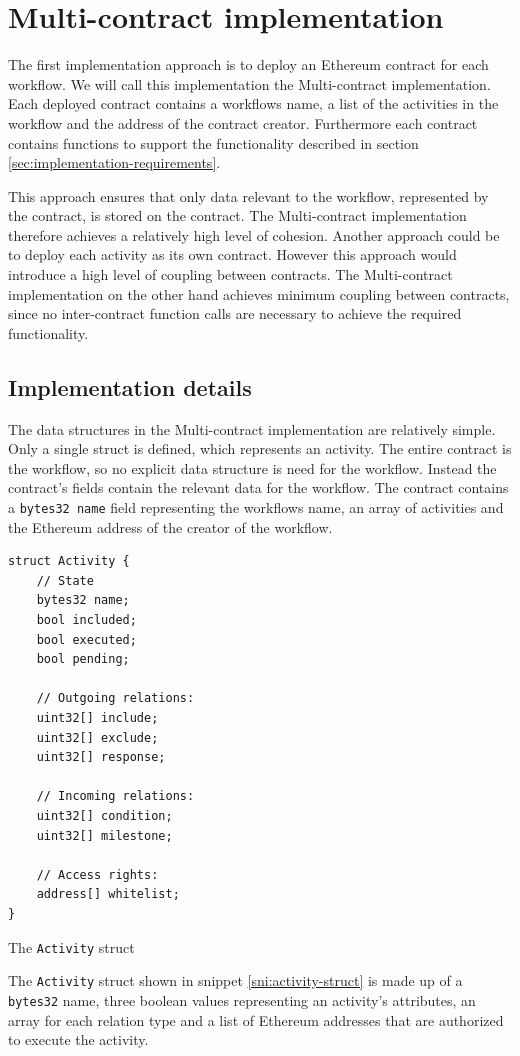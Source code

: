 \documentclass{article}
\begin{document}
	\section{Multi-contract implementation}

	The first implementation approach is to deploy an Ethereum contract for each workflow. We will call this implementation the Multi-contract implementation.
	Each deployed contract contains a workflows name, a list of the activities in the workflow and the address of the contract creator.
	Furthermore each contract contains functions to support the functionality described in section \ref{sec:implementation-requirements}.

	This approach ensures that only data relevant to the workflow, represented by the contract, is stored on the contract. The Multi-contract implementation therefore achieves a relatively high level of cohesion.
	Another approach could be to deploy each activity as its own contract.
	However this approach would introduce a high level of coupling between contracts.
	The Multi-contract implementation on the other hand achieves minimum coupling between contracts, since no inter-contract function calls are necessary to achieve the required functionality.

		\subsection{Implementation details}
		The data structures in the Multi-contract implementation are relatively simple.
		Only a single struct is defined, which represents an activity.
		The entire contract is the workflow, so no explicit data structure is need for the workflow. 
		Instead the contract's fields contain the relevant data for the workflow.
		The contract contains a \texttt{bytes32 name} field representing the workflows name, an array of activities and the Ethereum address of the creator of the workflow.
		\begin{snippet}[!ht]
			\centering
			\begin{lstlisting}[language=solidity, numbers=none]
struct Activity {
    // State
    bytes32 name;
    bool included;
    bool executed;
    bool pending;

    // Outgoing relations:
    uint32[] include;
    uint32[] exclude;
    uint32[] response;
    
    // Incoming relations:
    uint32[] condition;
    uint32[] milestone;

    // Access rights:
    address[] whitelist;
}				
			\end{lstlisting}
		 	\caption[The \texttt{Activity} struct]
		 	{The \texttt{Activity} struct}
		 	\label{sni:activity-struct}
		\end{snippet}
		The \texttt{Activity} struct shown in snippet \ref{sni:activity-struct} is made up of a \texttt{bytes32} name, three boolean values representing an activity's attributes, an array for each relation type and a list of Ethereum addresses that are authorized to execute the activity.
\end{document}
